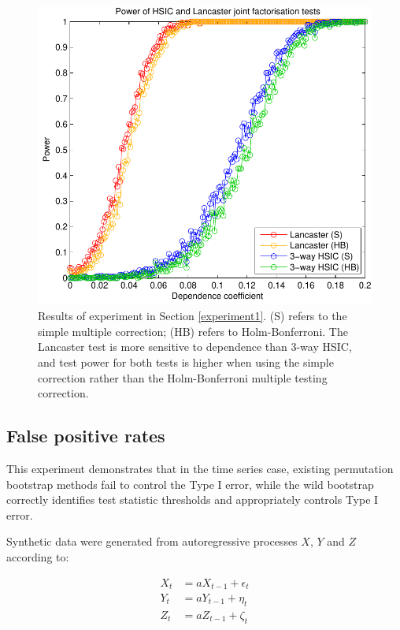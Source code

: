 \documentclass[]{article}
\begin{document}
\begin{figure}[ht]
\vskip 0.2in
\begin{center}
\centerline{\includegraphics[scale=0.6]{UAI_Figure1.pdf}}
\caption{Results of experiment in Section \ref{experiment1}. (S) refers to the simple multiple correction; (HB) refers to Holm-Bonferroni. The Lancaster test is more sensitive to dependence than 3-way HSIC, and test power for both tests is higher when using the simple correction rather than the Holm-Bonferroni multiple testing correction.}
\label{weak-pairwise-strong-joint}
\end{center}
\vskip -0.2in
\end{figure} 

\subsection{False positive rates}\label{experiment2}

This experiment demonstrates that in the time series case, existing permutation bootstrap methods fail to control the Type I error, while the  wild bootstrap correctly identifies test statistic thresholds and appropriately controls Type I error.

Synthetic data were generated from autoregressive processes $X$, $Y$ and $Z$ according to:

\begin{align*}
X_t &= aX_{t-1} + \epsilon_t\\
Y_t &= aY_{t-1} + \eta_t\\
Z_t &= aZ_{t-1} +  \zeta_t\\
\end{align*}
\end{document}
